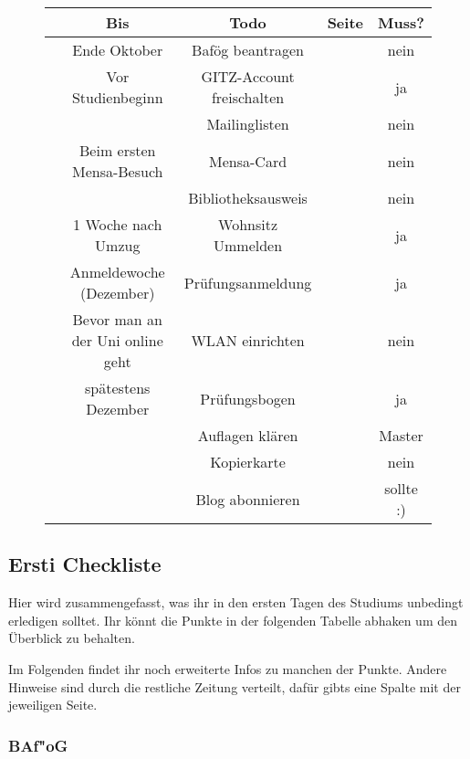\begin{figure}[h]

\begin{tabular}{|c|c|c|c|c|}
\hline &\textbf{Bis} 						& \textbf{Todo} 				& \textbf{Seite}& \textbf{Muss?} \\ 
\hline & Ende Oktober 						& Bafög beantragen 				&  				& nein \\ 
\hline & Vor Studienbeginn 					& GITZ-Account freischalten 	&  				& ja \\ 
\hline & 									& Mailinglisten 				&  				& nein \\ 
\hline & Beim ersten Mensa-Besuch 			& Mensa-Card 					&  				& nein \\ 
\hline & 									& Bibliotheksausweis 			&  				& nein \\
\hline & 1 Woche nach Umzug 				& Wohnsitz Ummelden 			&  				& ja \\ 
\hline & Anmeldewoche (Dezember) 			& Prüfungsanmeldung 			&  				& ja \\ 
\hline & Bevor man an der Uni online geht 	& WLAN einrichten 				&  				& nein \\ 
\hline & spätestens Dezember 				& Prüfungsbogen 				&  				& ja \\ 
\hline & 									& Auflagen klären 				&  				& Master \\ 
\hline & 									& Kopierkarte 					&  				& nein \\ 
\hline & 									& Blog abonnieren 				&  				& sollte :) \\ 
\end{tabular} 
\end{figure}


\subsection{Ersti Checkliste}

Hier wird zusammengefasst, was ihr in den ersten Tagen des Studiums
unbedingt erledigen solltet. Ihr könnt die Punkte in der folgenden
Tabelle abhaken um den Überblick zu behalten.

Im Folgenden findet ihr noch erweiterte Infos zu manchen der Punkte. 
Andere Hinweise sind durch die restliche Zeitung verteilt, dafür 
gibts eine Spalte mit der jeweiligen Seite.


\subsubsection{BAf"oG}

